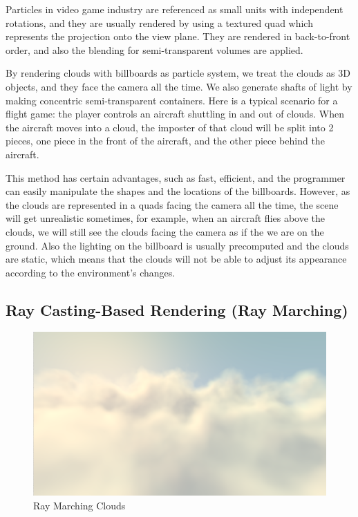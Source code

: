 Particles in video game industry are referenced as small units with independent rotations, and they are usually rendered by using a textured quad which represents the projection onto the view plane. They are rendered in back-to-front order, and also the blending for semi-transparent volumes are applied.

By rendering clouds with billboards as particle system, we treat the clouds as 3D objects, and they face the camera all the time. We also generate shafts of light by making concentric semi-transparent containers. Here is a typical scenario for a flight game: the player controls an aircraft shuttling in and out of clouds. When the aircraft moves into a cloud, the imposter of that cloud will be split into 2 pieces, one piece in the front of the aircraft, and the other piece behind the aircraft.

This method has certain advantages, such as fast, efficient, and the programmer can easily manipulate the shapes and the locations of the billboards. However, as the clouds are represented in a quads facing the camera all the time, the scene will get unrealistic sometimes, for example, when an aircraft flies above the clouds, we will still see the clouds facing the camera as if the we are on the ground. Also the lighting on the billboard is usually precomputed and the clouds are static, which means that the clouds will not be able to adjust its appearance according to the environment's changes.

\subsection{Ray Casting-Based Rendering (Ray Marching)}

\begin{figure}[htp]
\begin{center}
\includegraphics[scale=0.5]{images/raymarching.png}
\caption{Ray Marching Clouds}
\label{f3}
\end{center}
\end{figure}

